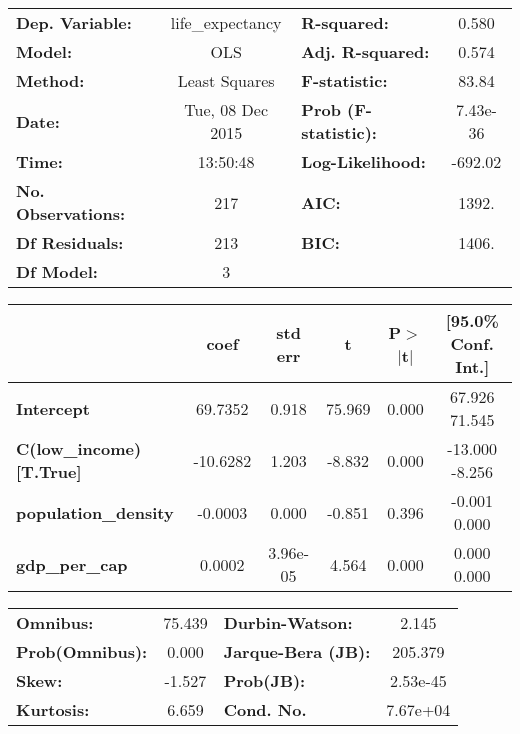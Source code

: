 \begin{center}
\begin{tabular}{lclc}
\toprule
\textbf{Dep. Variable:}        & life_expectancy  & \textbf{  R-squared:         } &     0.580   \\
\textbf{Model:}                &       OLS        & \textbf{  Adj. R-squared:    } &     0.574   \\
\textbf{Method:}               &  Least Squares   & \textbf{  F-statistic:       } &     83.84   \\
\textbf{Date:}                 & Tue, 08 Dec 2015 & \textbf{  Prob (F-statistic):} &  7.43e-36   \\
\textbf{Time:}                 &     13:50:48     & \textbf{  Log-Likelihood:    } &   -692.02   \\
\textbf{No. Observations:}     &         217      & \textbf{  AIC:               } &     1392.   \\
\textbf{Df Residuals:}         &         213      & \textbf{  BIC:               } &     1406.   \\
\textbf{Df Model:}             &           3      & \textbf{                     } &             \\
\bottomrule
\end{tabular}
\begin{tabular}{lccccc}
                               & \textbf{coef} & \textbf{std err} & \textbf{t} & \textbf{P$>$$|$t$|$} & \textbf{[95.0\% Conf. Int.]}  \\
\midrule
\textbf{Intercept}             &      69.7352  &        0.918     &    75.969  &         0.000        &        67.926    71.545       \\
\textbf{C(low_income)[T.True]} &     -10.6282  &        1.203     &    -8.832  &         0.000        &       -13.000    -8.256       \\
\textbf{population_density}    &      -0.0003  &        0.000     &    -0.851  &         0.396        &        -0.001     0.000       \\
\textbf{gdp_per_cap}           &       0.0002  &     3.96e-05     &     4.564  &         0.000        &         0.000     0.000       \\
\bottomrule
\end{tabular}
\begin{tabular}{lclc}
\textbf{Omnibus:}       & 75.439 & \textbf{  Durbin-Watson:     } &    2.145  \\
\textbf{Prob(Omnibus):} &  0.000 & \textbf{  Jarque-Bera (JB):  } &  205.379  \\
\textbf{Skew:}          & -1.527 & \textbf{  Prob(JB):          } & 2.53e-45  \\
\textbf{Kurtosis:}      &  6.659 & \textbf{  Cond. No.          } & 7.67e+04  \\
\bottomrule
\end{tabular}
\end{center}